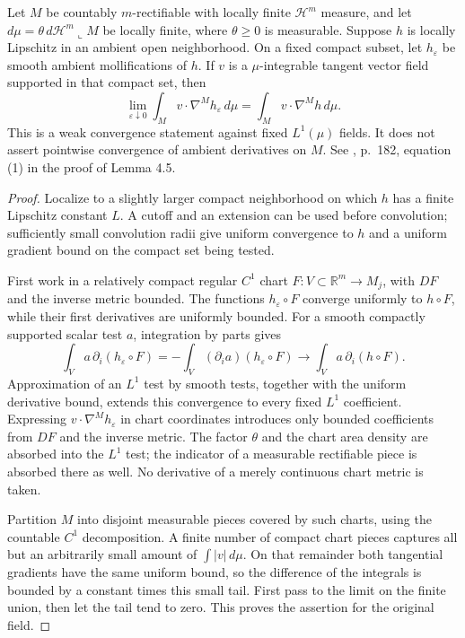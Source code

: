 \begin{lemma}\label{lem:weak-tangential-mollification}
Let $M$ be countably $m$-rectifiable with locally finite $\mathcal H^m$ measure, and let $d\mu=\theta\,d\mathcal H^m\llcorner M$ be locally finite, where $\theta\geq0$ is measurable. Suppose $h$ is locally Lipschitz in an ambient open neighborhood. On a fixed compact subset, let $h_\varepsilon$ be smooth ambient mollifications of $h$. If $v$ is a $\mu$-integrable tangent vector field supported in that compact set, then
\[
 \lim_{\varepsilon\downarrow0}\int_M v\cdot\nabla^Mh_\varepsilon\,d\mu
 =\int_M v\cdot\nabla^Mh\,d\mu.
\]
This is a weak convergence statement against fixed $L^1(\mu)$ fields. It does not assert pointwise convergence of ambient derivatives on $M$. See \cite{Sim18}, p.~182, equation (1) in the proof of Lemma 4.5.
\end{lemma}
\begin{proof}
Localize to a slightly larger compact neighborhood on which $h$ has a finite Lipschitz constant $L$. A cutoff and an extension can be used before convolution; sufficiently small convolution radii give uniform convergence to $h$ and a uniform gradient bound on the compact set being tested.

First work in a relatively compact regular $C^1$ chart $F:V\subset\mathbb R^m\to M_j$, with $DF$ and the inverse metric bounded. The functions $h_\varepsilon\circ F$ converge uniformly to $h\circ F$, while their first derivatives are uniformly bounded. For a smooth compactly supported scalar test $a$, integration by parts gives
\[
 \int_V a\,\partial_i(h_\varepsilon\circ F)
 =-\int_V(\partial_i a)(h_\varepsilon\circ F)
 \longrightarrow\int_V a\,\partial_i(h\circ F).
\]
Approximation of an $L^1$ test by smooth tests, together with the uniform derivative bound, extends this convergence to every fixed $L^1$ coefficient. Expressing $v\cdot\nabla^Mh_\varepsilon$ in chart coordinates introduces only bounded coefficients from $DF$ and the inverse metric. The factor $\theta$ and the chart area density are absorbed into the $L^1$ test; the indicator of a measurable rectifiable piece is absorbed there as well. No derivative of a merely continuous chart metric is taken.

Partition $M$ into disjoint measurable pieces covered by such charts, using the countable $C^1$ decomposition. A finite number of compact chart pieces captures all but an arbitrarily small amount of $\int|v|\,d\mu$. On that remainder both tangential gradients have the same uniform bound, so the difference of the integrals is bounded by a constant times this small tail. First pass to the limit on the finite union, then let the tail tend to zero. This proves the assertion for the original field.
\end{proof}


